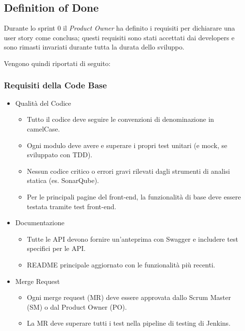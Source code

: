 \documentclass{article}
\begin{document}
\subsection{Definition of Done}
Durante lo sprint 0 il \textit{Product Owner} ha definito i requisiti per dichiarare una user story come conclusa;
questi requisiti sono stati accettati dai developers e sono rimasti invariati durante tutta la durata dello sviluppo.

Vengono quindi riportati di seguito:

\subsubsection{Requisiti della Code Base}
\begin{itemize}
    \item Qualità del Codice
    \begin{itemize}
        \item Tutto il codice deve seguire le convenzioni di denominazione in camelCase.
        \item Ogni modulo deve avere e superare i propri test unitari (e mock, se sviluppato con TDD).
        \item Nessun codice critico o errori gravi rilevati dagli strumenti di analisi statica (es. SonarQube).
        \item Per le principali pagine del front-end, la funzionalità di base deve essere testata tramite test front-end.
    \end{itemize}

    \item Documentazione
    \begin{itemize}
        \item Tutte le API devono fornire un'anteprima con Swagger e includere test specifici per le API.
        \item README principale aggiornato con le funzionalità più recenti.
    \end{itemize}

    \item Merge Request
    \begin{itemize}
        \item Ogni merge request (MR) deve essere approvata dallo Scrum Master (SM) o dal Product Owner (PO).
        \item La MR deve superare tutti i test nella pipeline di testing di Jenkins.
    \end{itemize}


\end{itemize}
\end{document}
